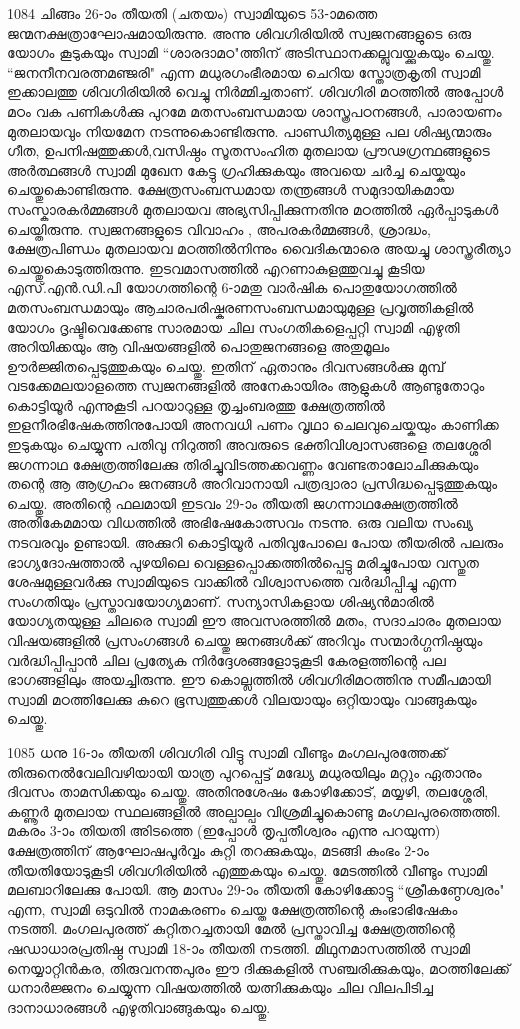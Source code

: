 \documentclass[12pt,openany]{book}
\begin{document}
	1084 ചിങ്ങം 26-ാം തീയതി (ചതയം) സ്വാമിയുടെ 53-ാമത്തെ ജന്മനക്ഷത്രാഘോഷമായിരുന്നു. അന്നു ശിവഗിരിയിൽ സ്വജനങ്ങളുടെ ഒരു യോഗം കൂടുകയും സ്വാമി ``ശാരദാമഠ"ത്തിന് അടിസ്ഥാനക്കല്ലുവയ്ക്കുകയും ചെയ്തു. ``ജനനീനവരത്നമഞ്ജരി" എന്ന മധുരഗംഭീരമായ ചെറിയ സ്തോത്രകൃതി സ്വാമി ഇക്കാലത്തു ശിവഗിരിയിൽ വെച്ചു നിർമ്മിച്ചതാണ്. ശിവഗിരി മഠത്തിൽ അപ്പോൾ മഠം വക പണികൾക്കു പുറമേ മതസംബന്ധമായ ശാസ്ത്രപഠനങ്ങൾ, പാരായണം മുതലായവും നിയമേന നടന്നുകൊണ്ടിരുന്നു. പാണ്ഡിത്യമുള്ള പല ശിഷ്യന്മാരും ഗീത, ഉപനിഷത്തുക്കൾ,വസിഷ്ഠം സൂതസംഹിത മുതലായ പ്രൗഢഗ്രന്ഥങ്ങളുടെ അർത്ഥങ്ങൾ സ്വാമി മുഖേന കേട്ടു ഗ്രഹിക്കുകയും അവയെ ചർച്ച ചെയ്കയും ചെയ്തുകൊണ്ടിരുന്നു. ക്ഷേത്രസംബന്ധമായ തന്ത്രങ്ങൾ സമുദായികമായ സംസ്കാരകർമ്മങ്ങൾ മുതലായവ അഭ്യസിപ്പിക്കുന്നതിനു മഠത്തിൽ ഏർപ്പാടുകൾ ചെയ്തിരുന്നു. സ്വജനങ്ങളുടെ വിവാഹം , അപരകർമ്മങ്ങൾ, ശ്രാദ്ധം, ക്ഷേത്രപിണ്ഡം മുതലായവ മഠത്തിൽനിന്നും വൈദികന്മാരെ അയച്ചു ശാസ്ത്രരീത്യാ ചെയ്തുകൊടുത്തിരുന്നു. ഇടവമാസത്തിൽ എറണാകുളത്തുവച്ചു കൂടിയ എസ്.എൻ.ഡി.പി യോഗത്തിന്റെ 6-ാമതു വാർഷിക പൊതുയോഗത്തിൽ മതസംബന്ധമായും ആചാരപരിഷ്കരണസംബന്ധമായുമുള്ള പ്രവൃത്തികളിൽ യോഗം ദൃഷ്ടിവെക്കേണ്ട സാരമായ ചില സംഗതികളെപ്പറ്റി സ്വാമി എഴുതി അറിയിക്കയും ആ വിഷയങ്ങളിൽ പൊതുജനങ്ങളെ അതുമൂലം ഊർജ്ജിതപ്പെടുത്തുകയും ചെയ്തു. ഇതിന് ഏതാനും ദിവസങ്ങൾക്കു മുമ്പ് വടക്കേമലയാളത്തെ സ്വജനങ്ങളിൽ അനേകായിരം ആളുകൾ ആണ്ടുതോറും കൊട്ടിയൂർ എന്നുകൂടി പറയാറുള്ള തൃച്ചംബരത്തു ക്ഷേത്രത്തിൽ ഇളനീരഭിഷേകത്തിനുപോയി അനവധി പണം വൃഥാ ചെലവുചെയ്കയും കാണിക്ക ഇടുകയും ചെയ്യുന്ന പതിവു നിറുത്തി അവരുടെ ഭക്തിവിശ്വാസങ്ങളെ തലശ്ശേരി ജഗന്നാഥ ക്ഷേത്രത്തിലേക്കു തിരിച്ചുവിടത്തക്കവണ്ണം വേണ്ടതാലോചിക്കുകയും തന്റെ ആ ആഗ്രഹം ജനങ്ങൾ അറിവാനായി പത്രദ്വാരാ പ്രസിദ്ധപ്പെടുത്തുകയും ചെയ്തു. അതിന്റെ ഫലമായി ഇടവം 29-ാം തീയതി ജഗന്നാഥക്ഷേത്രത്തിൽ അതികേമമായ വിധത്തിൽ അഭിഷേകോത്സവം നടന്നു. ഒരു വലിയ സംഖ്യ നടവരവും ഉണ്ടായി. അക്കുറി കൊട്ടിയൂർ പതിവുപോലെ പോയ തീയരിൽ പലരും ഭാഗ്യദോഷത്താൽ പുഴയിലെ വെള്ളപ്പൊക്കത്തിൽപ്പെട്ടു മരിച്ചുപോയ വസ്തുത ശേഷമുള്ളവർക്കു സ്വാമിയുടെ വാക്കിൽ വിശ്വാസത്തെ വർദ്ധിപ്പിച്ചു എന്ന സംഗതിയും പ്രസ്താവയോഗ്യമാണ്. സന്യാസികളായ ശിഷ്യൻമാരിൽ യോഗ്യതയുള്ള ചിലരെ സ്വാമി ഈ അവസരത്തിൽ മതം, സദാചാരം മുതലായ വിഷയങ്ങളിൽ പ്രസംഗങ്ങൾ ചെയ്തു ജനങ്ങൾക്ക് അറിവും സന്മാർഗ്ഗനിഷ്ഠയും വർദ്ധിപ്പിപ്പാൻ ചില പ്രത്യേക നിർദ്ദേശങ്ങളോടുകൂടി കേരളത്തിന്റെ പല ഭാഗങ്ങളിലും അയച്ചിരുന്നു. ഈ കൊല്ലത്തിൽ ശിവഗിരിമഠത്തിനു സമീപമായി സ്വാമി മഠത്തിലേക്കു കുറെ ഭൂസ്വത്തുക്കൾ വിലയായും ഒറ്റിയായും വാങ്ങുകയും ചെയ്തു.
	
	1085 ധനു 16-ാം തീയതി ശിവഗിരി വിട്ടു സ്വാമി വീണ്ടും മംഗലപുരത്തേക്ക് തിരുനെൽവേലിവഴിയായി യാത്ര പുറപ്പെട്ട് മദ്ധ്യേ മധുരയിലും മറ്റും ഏതാനും ദിവസം താമസിക്കയും ചെയ്തു. അതിനുശേഷം കോഴിക്കോട്, മയ്യഴി, തലശ്ശേരി, കണ്ണൂർ മുതലായ സ്ഥലങ്ങളിൽ അല്പാല്പം വിശ്രമിച്ചുകൊണ്ടു മംഗലപുരത്തെത്തി. മകരം 3-ാം തിയതി അിടത്തെ (ഇപ്പോൾ തൃപ്പതീശ്വരം എന്നു പറയുന്ന) ക്ഷേത്രത്തിന് ആഘോഷപൂർവ്വം കുറ്റി തറക്കുകയും, മടങ്ങി കുംഭം 2-ാം തീയതിയോടുകൂടി ശിവഗിരിയിൽ എത്തുകയും ചെയ്തു. മേടത്തിൽ വീണ്ടും സ്വാമി മലബാറിലേക്കു പോയി. ആ മാസം 29-ാം തീയതി കോഴിക്കോട്ടു ``ശ്രീകണ്ഠേശ്വരം" എന്ന, സ്വാമി ഒടുവിൽ നാമകരണം ചെയ്ത ക്ഷേത്രത്തിന്റെ കുംഭാഭിഷേകം നടത്തി. മംഗലപുരത്ത് കുറ്റിതറച്ചതായി മേൽ പ്രസ്താവിച്ച ക്ഷേത്രത്തിന്റെ ഷഡാധാരപ്രതിഷ്ഠ സ്വാമി 18-ാം തീയതി നടത്തി. മിഥുനമാസത്തിൽ സ്വാമി നെയ്യാറ്റിൻകര, തിരുവനന്തപുരം ഈ ദിക്കുകളിൽ സഞ്ചരിക്കുകയും, മഠത്തിലേക്ക് ധനാർജ്ജനം ചെയ്യുന്ന വിഷയത്തിൽ യത്നിക്കുകയും ചില വിലപിടിച്ച ദാനാധാരങ്ങൾ എഴുതിവാങ്ങുകയും ചെയ്തു.
	
\end{document}
